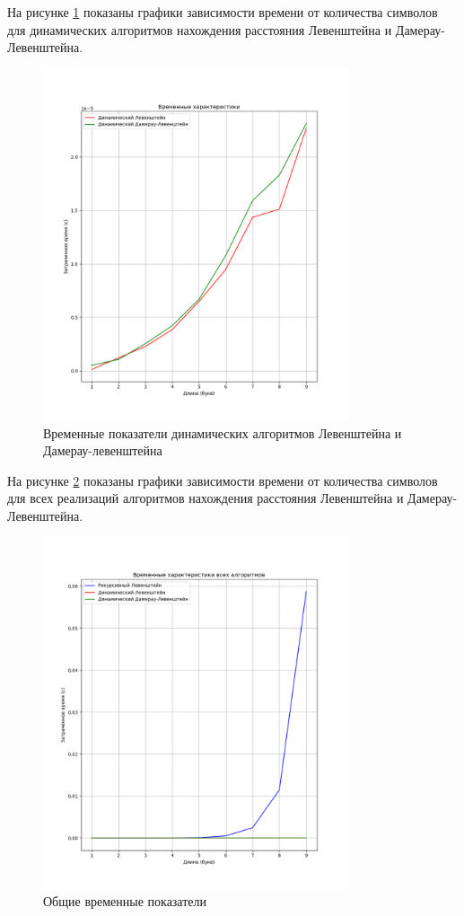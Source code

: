 На рисунке \ref{fig:DvsD} показаны графики зависимости времени от количества символов
для динамических алгоритмов нахождения расстояния Левенштейна и Дамерау-Левенштейна.
\begin{figure}[h]
    \centering
    \includegraphics[width=0.8\textwidth]{images/Figure_2}
    \caption{Временные показатели динамических алгоритмов Левенштейна и Дамерау-левенштейна}
    \label{fig:DvsD}
\end{figure}

\clearpage

На рисунке \ref{fig:ALLvsALL} показаны графики зависимости времени от количества символов
для всех реализаций алгоритмов нахождения расстояния Левенштейна и Дамерау-Левенштейна.
\begin{figure}[h]
    \centering
    \includegraphics[width=0.8\textwidth]{images/Figure_3}
    \caption{Общие временные показатели}
    \label{fig:ALLvsALL}
\end{figure}

